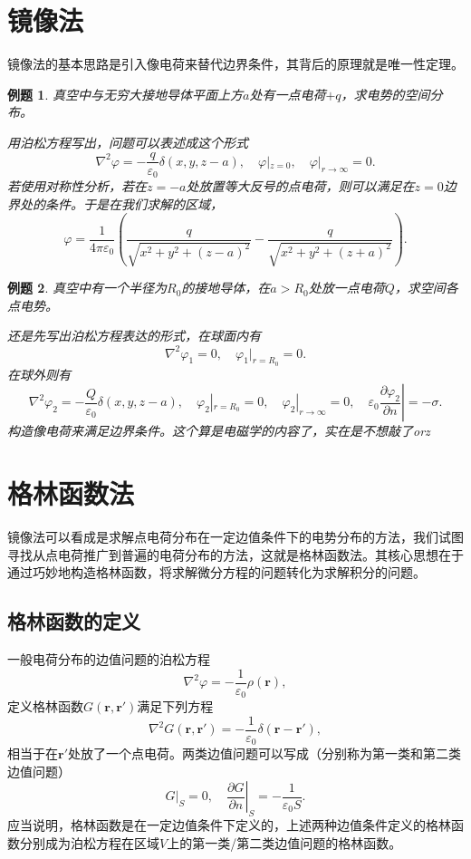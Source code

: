 \documentclass[UTF8]{ctexbook}
\renewcommand{\b}{\boldsymbol}
\renewcommand{\k}{\frac{1}{4\pi\varepsilon_0}}
\newtheorem{eg}{例题}
\numberwithin{equation}{chapter}
\begin{document}
	\section{镜像法}
	镜像法的基本思路是引入像电荷来替代边界条件，其背后的原理就是唯一性定理。
	
	\begin{eg}
		真空中与无穷大接地导体平面上方$a$处有一点电荷$+q$，求电势的空间分布。
		
		用泊松方程写出，问题可以表述成这个形式
		\[\nabla^2 \varphi=-\frac{q}{\varepsilon_0}\delta(x,y,z-a),\quad \varphi|_{z=0},\quad \varphi|_{r\rightarrow \infty}=0.\]
		若使用对称性分析，若在$z=-a$处放置等大反号的点电荷，则可以满足在$z=0$边界处的条件。于是在我们求解的区域，
		\[\varphi=\k \left(\frac{q}{\sqrt{x^2+y^2+(z-a)^2}}-\frac{q}{\sqrt{x^2+y^2+(z+a)^2}}\right).\]
	\end{eg}
	
	\begin{eg}
		真空中有一个半径为$R_0$的接地导体，在$a>R_0$处放一点电荷$Q$，求空间各点电势。
		
		还是先写出泊松方程表达的形式，在球面内有
		\[\nabla^2 \varphi_1=0,\quad \varphi_1|_{r=R_0}=0.\]
		在球外则有
		\[\nabla^2\varphi_2=-\frac{Q}{\varepsilon_0}\delta(x,y,z-a),\quad\varphi_2|_{r=R_0}=0,\quad \varphi_2|_{r\rightarrow \infty}=0,\quad \varepsilon_0\left.\frac{\partial \varphi_2}{\partial n}\right|=-\sigma.\]
		构造像电荷来满足边界条件。这个算是电磁学的内容了，实在是不想敲了orz
	\end{eg}

	\section{格林函数法}
	镜像法可以看成是求解点电荷分布在一定边值条件下的电势分布的方法，我们试图寻找从点电荷推广到普遍的电荷分布的方法，这就是格林函数法。其核心思想在于通过巧妙地构造格林函数，将求解微分方程的问题转化为求解积分的问题。
	\subsection{格林函数的定义}
	一般电荷分布的边值问题的泊松方程
	\[\nabla^2\varphi=-\frac{1}{\varepsilon_0}\rho(\b{r}),\]
	定义格林函数$G(\b{r},\b{r}')$满足下列方程
	\[\nabla^2 G(\b{r},\b{r}')=-\frac{1}{\varepsilon_0}\delta(\b{r}-\b{r}'),\]
	相当于在$\b{r}'$处放了一个点电荷。两类边值问题可以写成（分别称为第一类和第二类边值问题）
	\[G|_S=0,\quad \left.\frac{\partial G}{\partial n}\right|_S=-\frac{1}{\varepsilon_0 S}.\]
	应当说明，格林函数是在一定边值条件下定义的，上述两种边值条件定义的格林函数分别成为泊松方程在区域$V$上的第一类/第二类边值问题的格林函数。
	
\end{document}
